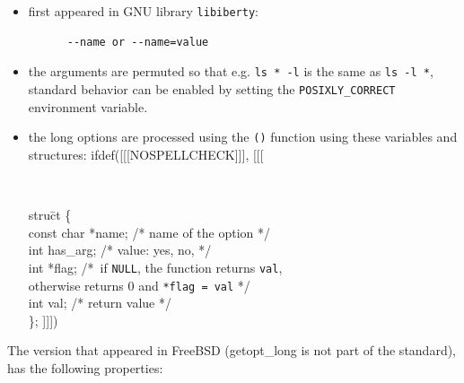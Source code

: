 

\begin{slide}
\setlength{\baselineskip}{0.8\baselineskip}
\begin{itemize}
\item first appeared in GNU library \texttt{libiberty}: 
\begin{verbatim}
      --name or --name=value
\end{verbatim}
\item the arguments are permuted so that e.g.
\verb#ls * -l# is the same as \verb#ls -l *#, standard behavior can be enabled
by setting the \verb#POSIXLY_CORRECT# environment variable.
\item the long options are processed using the \texttt{()}
function using these variables and structures:
ifdef([[[NOSPELLCHECK]]], [[[
{\tt
\begin{tabbing}
stru\=ct  \{\\
\>const char *name; \textrm{/* name of the option */} \\
\>int has\_arg; \textrm{/* value: yes, no,  */} \\
\>int *flag; \textrm{/*~}\=\textrm{if \texttt{NULL}, the function returns
\texttt{val}}, \\
\>\>\textrm{otherwise returns 0}
\textrm{and }\texttt{*flag = val}\textrm{ */} \\
\>int val; \textrm{/* return value */} \\
\};
]]])
\end{tabbing}}
\end{itemize}
\end{slide}

The version that appeared in FreeBSD (\textrm{getopt\_long} is not part
of the standard), has the following properties:

